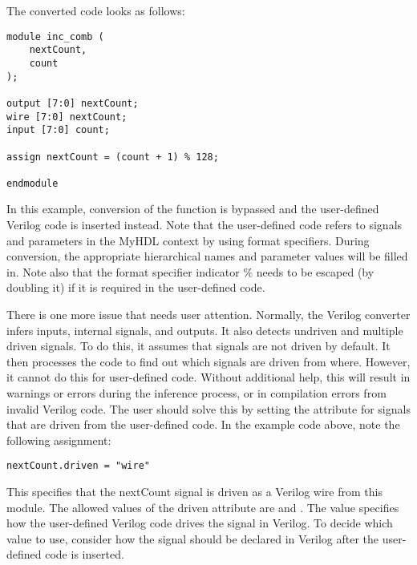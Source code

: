 The converted code looks as follows:

\begin{verbatim}
module inc_comb (
    nextCount,
    count
);

output [7:0] nextCount;
wire [7:0] nextCount;
input [7:0] count;

assign nextCount = (count + 1) % 128;

endmodule
\end{verbatim}

In this example, conversion of the  function is bypassed and
the user-defined Verilog code is inserted instead. Note that the
user-defined code refers to signals and parameters in the MyHDL
context by using format specifiers. During conversion, the appropriate
hierarchical names and parameter values will be filled in. Note also
that the format specifier indicator \% needs to be escaped (by doubling
it) if it is required in the user-defined code.

There is one more issue that needs user attention. Normally, the
Verilog converter infers inputs, internal signals, and outputs. It
also detects undriven and multiple driven signals. To do this, it
assumes that signals are not driven by default. It then processes the
code to find out which signals are driven from where. However, it
cannot do this for user-defined code. Without additional help, this
will result in warnings or errors during the inference process, or in
compilation errors from invalid Verilog code. The user should solve
this by setting the  attribute for signals that are driven from
the user-defined code. In the example code above, note the following
assignment:

\begin{verbatim}
nextCount.driven = "wire"
\end{verbatim}

This specifies that the nextCount signal is driven as a Verilog wire
from this module. The allowed values of the driven attribute are
 and . The value specifies how the
user-defined Verilog code drives the signal in Verilog. To decide
which value to use, consider how the signal should be declared in
Verilog after the user-defined code is inserted.


